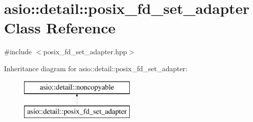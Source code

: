 \hypertarget{classasio_1_1detail_1_1posix__fd__set__adapter}{}\section{asio\+:\+:detail\+:\+:posix\+\_\+fd\+\_\+set\+\_\+adapter Class Reference}
\label{classasio_1_1detail_1_1posix__fd__set__adapter}


{\ttfamily \#include $<$posix\+\_\+fd\+\_\+set\+\_\+adapter.\+hpp$>$}

Inheritance diagram for asio\+:\+:detail\+:\+:posix\+\_\+fd\+\_\+set\+\_\+adapter\+:\begin{figure}[H]
\begin{center}
\leavevmode
\includegraphics[height=2.000000cm]{classasio_1_1detail_1_1posix__fd__set__adapter}
\end{center}
\end{figure}
